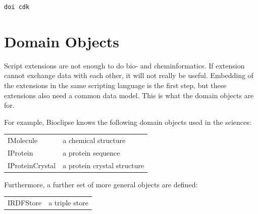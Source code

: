 \documentclass[a5paper, 10pt]{memoir}
\begin{document}
\begin{refsection}
\begin{Verbatim}
doi cdk
\end{Verbatim}

\section{Domain Objects}

Script extensions are not enough to do bio- and cheminformatics. If extension
cannot exchange data with each other, it will not really be useful. Embedding
of the extensions in the same scripting language is the first step, but
these extensions also need a common data model. This is what the domain objects are
for.

For example, Bioclipse knows the following domain objects used in the sciences:
\vspace{0.25cm}

\begin{tabular}{ l l }
  IMolecule\index{IMolecule}\index{molecule} & a chemical structure \\
  IProtein\index{IProtein}\index{protein} & a protein sequence \\
  IProteinCrystal\index{IProteinCrystal} & a protein crystal structure \\
\end{tabular}

Furthermore, a further set of more general objects are defined:

\begin{tabular}{ l l }
  IRDFStore\index{IRDFStore}\index{RDF} & a triple store \\
\end{tabular}

\printbibliography[heading=subbibliography]
\end{refsection}
\end{document}
